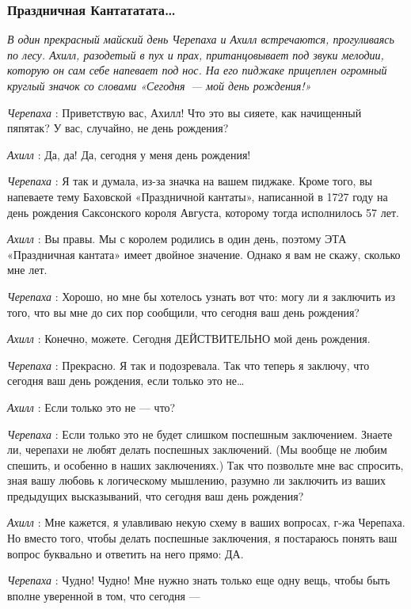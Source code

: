 \subsubsection{Праздничная Кантататата\ldots{}}

\emph{В один прекрасный майский день Черепаха и Ахилл встречаются, прогуливаясь по лесу. Ахилл, разодетый в пух и прах, пританцовывает под звуки мелодии, которую он сам себе напевает под нос. На его пиджаке прицеплен огромный круглый значок со словами «Сегодня~--- мой день рождения!»}

\emph{Черепаха} : Приветствую вас, Ахилл! Что это вы сияете, как начищенный пяпятак? У вас, случайно, не день рождения?

\emph{Ахилл} : Да, да! Да, сегодня у меня день рождения!

\emph{Черепаха} : Я так и думала, из-за значка на вашем пиджаке. Кроме того, вы напеваете тему Баховской «Праздничной кантаты», написанной в 1727 году на день рождения Саксонского короля Августа, которому тогда исполнилось 57 лет.

\emph{Ахилл} : Вы правы. Мы с королем родились в один день, поэтому ЭТА «Праздничная кантата» имеет двойное значение. Однако я вам не скажу, сколько мне лет.

\emph{Черепаха} : Хорошо, но мне бы хотелось узнать вот что: могу ли я заключить из того, что вы мне до сих пор сообщили, что сегодня ваш день рождения?

\emph{Ахилл} : Конечно, можете. Сегодня ДЕЙСТВИТЕЛЬНО мой день рождения.

\emph{Черепаха} : Прекрасно. Я так и подозревала. Так что теперь я заключу, что сегодня ваш день рождения, если только это не\ldots{}

\emph{Ахилл} : Если только это не --- что?

\emph{Черепаха} : Если только это не будет слишком поспешным заключением. Знаете ли, черепахи не любят делать поспешных заключений. (Мы вообще не любим спешить, и особенно в наших заключениях.) Так что позвольте мне вас спросить, зная вашу любовь к логическому мышлению, разумно ли заключить из ваших предыдущих высказываний, что сегодня ваш день рождения?

\emph{Ахилл} : Мне кажется, я улавливаю некую схему в ваших вопросах, г-жа Черепаха. Но вместо того, чтобы делать поспешные заключения, я постараюсь понять ваш вопрос буквально и ответить на него прямо: ДА.

\emph{Черепаха} : Чудно! Чудно! Мне нужно знать только еще одну вещь, чтобы быть вполне уверенной в том, что сегодня ---

